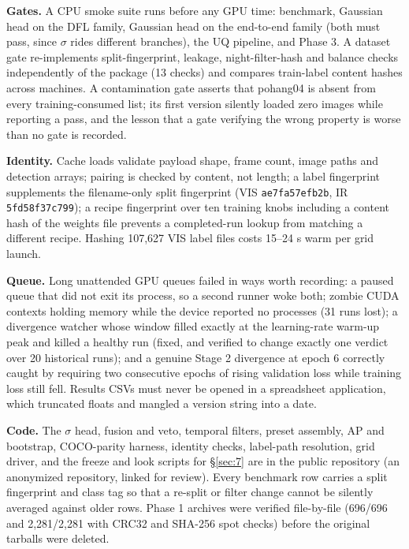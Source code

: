 \documentclass[10pt]{article}
\begin{document}
\textbf{Gates.} A CPU smoke suite runs before any GPU time: benchmark, Gaussian head on the DFL family, Gaussian head on the end-to-end family (both must pass, since $\sigma$ rides different branches), the UQ pipeline, and Phase 3. A dataset gate re-implements split-fingerprint, leakage, night-filter-hash and balance checks independently of the package (13 checks) and compares train-label content hashes across machines. A contamination gate asserts that pohang04 is absent from every training-consumed list; its first version silently loaded zero images while reporting a pass, and the lesson that a gate verifying the wrong property is worse than no gate is recorded.

\textbf{Identity.} Cache loads validate payload shape, frame count, image paths and detection arrays; pairing is checked by content, not length; a label fingerprint supplements the filename-only split fingerprint (VIS \texttt{ae7fa57efb2b}, IR \texttt{5fd58f37c799}); a recipe fingerprint over ten training knobs including a content hash of the weights file prevents a completed-run lookup from matching a different recipe. Hashing 107,627 VIS label files costs 15--24 s warm per grid launch.

\textbf{Queue.} Long unattended GPU queues failed in ways worth recording: a paused queue that did not exit its process, so a second runner woke both; zombie CUDA contexts holding memory while the device reported no processes (31 runs lost); a divergence watcher whose window filled exactly at the learning-rate warm-up peak and killed a healthy run (fixed, and verified to change exactly one verdict over 20 historical runs); and a genuine Stage 2 divergence at epoch 6 correctly caught by requiring two consecutive epochs of rising validation loss while training loss still fell. Results CSVs must never be opened in a spreadsheet application, which truncated floats and mangled a version string into a date.

\textbf{Code.} The $\sigma$ head, fusion and veto, temporal filters, preset assembly, AP and bootstrap, COCO-parity harness, identity checks, label-path resolution, grid driver, and the freeze and look scripts for \S\ref{sec:7} are in the public repository (an anonymized repository, linked for review). Every benchmark row carries a split fingerprint and class tag so that a re-split or filter change cannot be silently averaged against older rows. Phase 1 archives were verified file-by-file (696/696 and 2,281/2,281 with CRC32 and SHA-256 spot checks) before the original tarballs were deleted.
\end{document}
